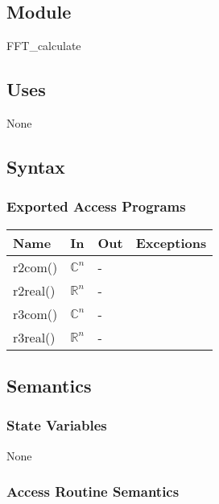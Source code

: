 \documentclass[12pt, titlepage]{article}
\begin{document}
\subsection{Module}

FFT\_calculate

\subsection{Uses}
None
\subsection{Syntax}

\subsubsection{Exported Access Programs}

\begin{center}
\begin{tabular}{p{2cm} p{4cm} p{4cm} p{2cm}}
\hline
\textbf{Name} & \textbf{In} & \textbf{Out} & \textbf{Exceptions} \\
\hline
r2com() &$\mathbb{C}^ n$& - & \\
r2real()&$\mathbb{R}^ n$ & - & \\
r3com()&$\mathbb{C}^ n$ & - & \\
r3real()&$\mathbb{R}^ n$& -&\\

\hline
\end{tabular}
\end{center}

\subsection{Semantics}

\subsubsection{State Variables}
None

\subsubsection{Access Routine Semantics}
\end{document}
